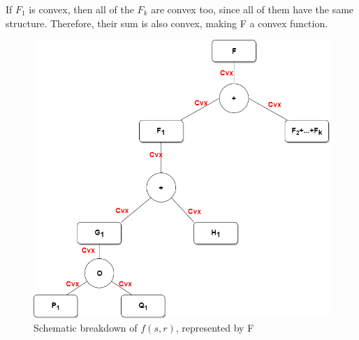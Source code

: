 If $F_1$ is convex, then all of the $F_k$ are convex too, since all of them have the same structure. Therefore, their sum is also convex, making F a convex function.
\begin{figure}[H]
	\centering
	\includegraphics[width=0.5\linewidth]{part2/figures/Convex.png}
	\caption{Schematic breakdown of $f(s,r)$, represented by F} \label{pt2task1:conv}		
\end{figure}
